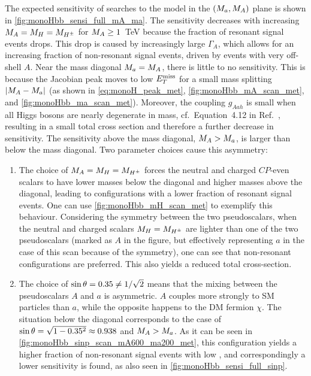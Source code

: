 The expected sensitivity of \monohbb searches to the \hdma model in the $(M_{a},M_{A})$ plane is shown in \autoref{fig:monoHbb_sensi_full_mA_ma}.
The sensitivity decreases with increasing $M_{A} = M_{H} = M_{H^{\pm}}$ for $M_{A} \geq 1$~TeV because the fraction of resonant signal events drops. 
This drop is caused by increasingly large $\Gamma_A$, which allows for an increasing fraction of non-resonant signal events, driven by events with very off-shell $A$. 
Near the mass diagonal $M_{a} = M_{A}$, there is little to no sensitivity. 
This is because the Jacobian peak moves to low $E_T^\mathrm{miss}$ for a small mass splitting $|M_{A} - M_{a}|$  (as shown in \autoref{eq:monoH_peak_met}, \autoref{fig:monoHbb_mA_scan_met}, and \autoref{fig:monoHbb_ma_scan_met}). 
Moreover, the coupling $g_{Aah}$ is small when all Higgs bosons are nearly degenerate in mass, cf.~Equation~4.12 in Ref.~\cite{Bauer:2017ota}, %
resulting in a small total cross section and therefore a further decrease in sensitivity.
The sensitivity above the mass diagonal, $M_{A} > M_{a}$, is larger than below the mass diagonal.
Two parameter choices cause this asymmetry:
\begin{enumerate}
\item 
The choice of $M_{A} = M_{H} = M_{H^{\pm}}$ forces the neutral and charged $CP$-even scalars to have lower masses below the diagonal and higher masses above the diagonal, leading to configurations with a lower fraction of resonant signal events. One can use \autoref{fig:monoHbb_mH_scan_met} to exemplify this behaviour. Considering the symmetry between the two pseudoscalars, when the neutral and charged scalars $M_{H} = M_{H^{\pm}}$ are lighter than one of the two pseudoscalars (marked as $A$ in the figure, but effectively representing $a$ in the case of this scan because of the symmetry), one can see that non-resonant configurations are preferred. This also yields a reduced total cross-section. 
\item 
The choice of $\sin\theta = 0.35 \neq 1/\sqrt{2}$ means that the mixing between the pseudoscalars $A$ and $a$ is asymmetric. 
$A$ couples more strongly to SM particles than $a$, while the opposite happens to the DM fermion $\chi$.
The situation below the diagonal corresponds to the case of $\sin\theta = \sqrt{1-0.35^2} \approx 0.938$ and $M_{A} > M_{a}$. 
As it can be seen in \autoref{fig:monoHbb_sinp_scan_mA600_ma200_met}, this \sinp configuration yields a higher fraction of non-resonant signal events with low \met, and correspondingly a lower sensitivity is found, as also seen in \autoref{fig:monoHbb_sensi_full_sinp}.
\end{enumerate}

